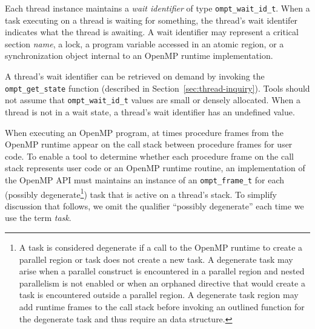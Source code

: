 Each thread instance maintains a {\em wait identifier} of type \verb|ompt_wait_id_t|. 
When a task executing on a thread is waiting for something, the thread's wait identifer indicates what the thread is awaiting. 
A wait identifier may represent a critical section {\em name}, a lock,  a program variable accessed in an atomic region, or a synchronization object internal to an OpenMP runtime implementation. 
\begin{comment}
\begin{quote}
\begin{verbatim}
typedef uint64_t ompt_wait_id_t;
\end{verbatim}
\end{quote}
\end{comment}
A thread's wait identifier can be retrieved on demand by invoking the \verb|ompt_get_state| function (described in Section~\ref{sec:thread-inquiry}).
Tools should not assume that \verb|ompt_wait_id_t| values are small or densely allocated. 
When a thread is not in a wait state, a thread's wait identifier has an undefined value.
 

When executing an OpenMP program, at times procedure frames from the OpenMP runtime appear on the call stack between procedure frames for user code.
To enable a tool to determine whether each procedure frame on the call stack represents 
user code or an OpenMP runtime routine,
an implementation of the OpenMP API must maintains an instance of an \verb|ompt_frame_t| 
for each (possibly degenerate\footnote{
A task is considered degenerate if a call to the OpenMP runtime to create a parallel 
region or task does not create a new task. 
A degenerate task may arise when a parallel construct is encountered
in a parallel region and nested parallelism is not enabled or when an orphaned directive that would create a task is encountered outside a parallel region.
A degenerate task region may add runtime frames to the call stack before 
invoking an outlined function for the degenerate task and thus require an  
data structure.}) task that is active on a thread's stack.
To simplify discussion that follows, 
we omit the qualifier ``possibly degenerate'' each time we use the term {\em task}.

